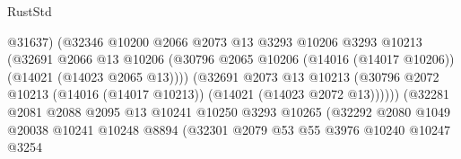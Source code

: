 \begin{lexlean}{RustStd}
\begin{coremodule}
                                          @31637)
                                        (@32346
                                          @10200
                                          @2066
                                          @2073
                                          @13
                                          @3293
                                          @10206
                                          @3293
                                          @10213
                                          (@32691
                                            @2066
                                            @13
                                            @10206
                                            (@30796
                                              @2065
                                              @10206
                                              (@14016 (@14017 @10206))
                                              (@14021 (@14023 @2065 @13))))
                                          (@32691
                                            @2073
                                            @13
                                            @10213
                                            (@30796
                                              @2072
                                              @10213
                                              (@14016 (@14017 @10213))
                                              (@14021 (@14023 @2072 @13))))))
                                      (@32281
                                        @2081
                                        @2088
                                        @2095
                                        @13
                                        @10241
                                        @10250
                                        @3293
                                        @10265
                                        (@32292
                                          @2080
                                          @1049
                                          @20038
                                          @10241
                                          @10248
                                          @8894
                                          (@32301
                                            @2079
                                            @53
                                            @55
                                            @3976
                                            @10240
                                            @10247
                                            @3254

\end{coremodule}
\end{lexlean}
